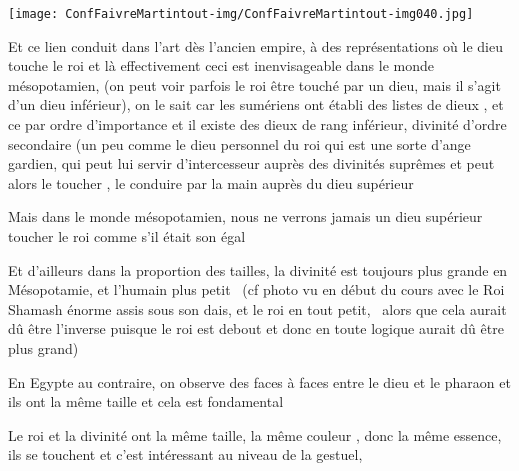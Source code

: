 \documentclass[a4paper]{article}
\begin{document}
\bigskip


\bigskip


\bigskip


\texttt{[image: ConfFaivreMartintout-img/ConfFaivreMartintout-img040.jpg]}



\bigskip


\bigskip


\bigskip


\bigskip


\bigskip


\bigskip


\bigskip


\bigskip


\bigskip

{
Et ce lien conduit dans l'art dès l'ancien empire, à des représentations
où le dieu touche le roi et là effectivement ceci est inenvisageable
dans le monde mésopotamien, (on peut voir parfois le roi être touché
par un dieu, mais il s'agit d'un dieu inférieur), on le sait car les
sumériens ont établi des listes de dieux , et ce par ordre d'importance
et il existe des dieux de rang inférieur, divinité d'ordre secondaire
(un peu comme le dieu personnel du roi qui est une sorte d'ange
gardien, qui peut lui servir d'intercesseur auprès des divinités
suprêmes et peut alors le toucher , le conduire par la main auprès du
dieu supérieur}

{
Mais dans le monde mésopotamien, nous ne verrons jamais un dieu
supérieur toucher le roi comme s'il était son égal}


\bigskip

{
Et d'ailleurs dans la proportion des tailles, la divinité est toujours
plus grande en Mésopotamie, et l'humain plus petit \ (cf photo vu en
début du cours avec le Roi Shamash énorme assis sous son dais, et le
roi en tout petit, \ alors que cela aurait dû être l'inverse puisque le
roi est debout et donc en toute logique aurait dû être plus grand)}


\bigskip


\bigskip

{
En Egypte au contraire, on observe des faces à faces entre le dieu et le
pharaon et ils ont la même taille et cela est fondamental }

{
Le roi et la divinité ont la même taille, la même couleur , donc la même
essence, ils se touchent et c'est intéressant au niveau de la gestuel,
}
\end{document}
